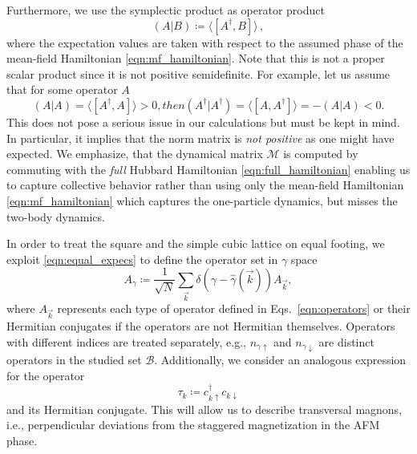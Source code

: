\documentclass[
    reprint, 
    aps,
    preprintnumbers,
    twocolumn,
    prb,
    superscriptaddress
]{revtex4-2}
\newcommand{\vk}{\vec{k}}
\newcommand{\up}{\uparrow}
\newcommand{\down}{\downarrow}
\newcommand{\mM}{\mathcal{M}}
\newcommand{\bs}{\begin{subequations}}
\newcommand{\es}{\end{subequations}}
\begin{document}
Furthermore, we use the symplectic product as operator product
\begin{equation}
\label{eqn:scalar_product}
    (A | B) \coloneqq  \langle [A^\dagger, B] \rangle\,,
\end{equation}
where the expectation values are taken with respect to the assumed phase of the mean-field Hamiltonian 
\eqref{eqn:mf_hamiltonian}.
Note that this is not a proper scalar product since it is not positive semidefinite.
For example, let us assume that for some operator $A$
\bs
\begin{equation}
(A | A) = \langle [A^\dagger, A] \rangle > 0,
\end{equation}
then
\begin{equation}
(A^\dagger | A^\dagger) = \langle [A, A^\dagger] \rangle = - (A | A)  < 0.
\end{equation}
\es
This does not pose a serious issue in our calculations but must be kept in mind.
In particular, it implies that the norm matrix is \emph{not positive} as one might have expected.
We emphasize, that the dynamical matrix  $\mM$ is computed
by commuting with the \emph{full} Hubbard Hamiltonian \eqref{eqn:full_hamiltonian} 
enabling us to capture collective behavior 
rather than using only the mean-field Hamiltonian \eqref{eqn:mf_hamiltonian}
which captures the one-particle dynamics, but misses
the two-body dynamics.

In order to treat the square and the simple cubic lattice on equal footing, we exploit 
\eqref{eqn:equal_expecs} to define the operator set in $\gamma$ space
\begin{equation}
    \label{eqn:ieom_basis_operator}
    A_\gamma \coloneqq \frac{1}{\sqrt{N}} \sum_{\vk} \delta (\gamma - \widehat{\gamma}( \vk )) A_{\vk},
\end{equation}
where $A_{\vk}$ represents each type of operator defined in Eqs.~\eqref{eqn:operators} or
their Hermitian conjugates if the operators are not Hermitian themselves.
Operators with different indices are treated separately, e.g., $n_{\gamma \up}$ and $n_{\gamma \down}$ 
are distinct operators in the studied set $\mathcal{B}$.
Additionally, we consider an analogous expression for the operator
\begin{equation}
    \tau_{k} \coloneqq c_{k \uparrow}^\dagger c_{k \downarrow}
\end{equation}
and its Hermitian conjugate.
This will allow us to describe transversal magnons, i.e., perpendicular 
deviations from the staggered magnetization in the AFM phase.
\end{document}
